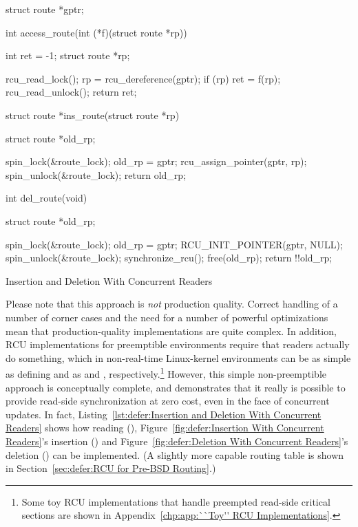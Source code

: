 \begin{listing}[tbp]
\begin{fcvlabel}
\begin{VerbatimL}[commandchars=\\\[\]]
struct route *gptr;

int access_route(int (*f)(struct route *rp))
{
	int ret = -1;
	struct route *rp;

	rcu_read_lock();
	rp = rcu_dereference(gptr);
	if (rp)
		ret = f(rp);		\lnlbl[access_rp]
	rcu_read_unlock();
	return ret;
}

struct route *ins_route(struct route *rp)
{
	struct route *old_rp;

	spin_lock(&route_lock);
	old_rp = gptr;
	rcu_assign_pointer(gptr, rp);
	spin_unlock(&route_lock);
	return old_rp;
}

int del_route(void)
{
	struct route *old_rp;

	spin_lock(&route_lock);
	old_rp = gptr;
	RCU_INIT_POINTER(gptr, NULL);
	spin_unlock(&route_lock);
	synchronize_rcu();
	free(old_rp);
	return !!old_rp;
}
\end{VerbatimL}
\end{fcvlabel}
\caption{Insertion and Deletion With Concurrent Readers}
\label{lst:defer:Insertion and Deletion With Concurrent Readers}
\end{listing}

Please note that this approach is \emph{not} production quality.
Correct handling of a number of corner cases and the need for a number
of powerful optimizations mean that production-quality implementations
are quite complex.
In addition, RCU implementations for preemptible environments
require that readers actually do something, which in non-real-time
Linux-kernel environments can be as simple as defining
 and  as 
and , respectively.\footnote{
	Some toy RCU implementations that handle preempted
	read-side critical sections are shown in
	Appendix~\ref{chp:app:``Toy'' RCU Implementations}.}
However, this simple non-preemptible approach is conceptually complete,
and demonstrates that it really is possible to provide read-side
synchronization at zero cost, even in the face of concurrent updates.
In fact,
Listing~\ref{lst:defer:Insertion and Deletion With Concurrent Readers}
shows how reading (),
Figure~\ref{fig:defer:Insertion With Concurrent Readers}'s
insertion () and
Figure~\ref{fig:defer:Deletion With Concurrent Readers}'s
deletion () can
be implemented.
(A slightly more capable routing table is shown in
Section~\ref{sec:defer:RCU for Pre-BSD Routing}.)

